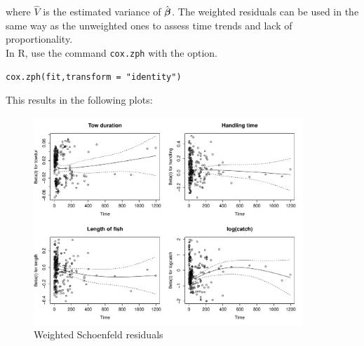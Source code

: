 \documentclass[11pt]{book}
\newcommand{\bfbeta}{{\mbox{\boldmath$\beta$}}}
\begin{document}
where $\widehat{V}$ is the estimated variance of $\hat{\bfbeta}$.  The weighted
residuals can be used in the same way as the unweighted ones to assess
time trends and lack of proportionality.
\\[2ex]
In R, use the command {\tt cox.zph} with the option.
\small
\begin{verbatim}
cox.zph(fit,transform = "identity")
\end{verbatim}
\normalsize
\newpage
This results in the following plots:
\begin{figure}[ht!]
\caption{Weighted Schoenfeld residuals}
\centerline{\includegraphics[width=4in]{wgt_sch_res.pdf}}
\end{figure}
\end{document}
